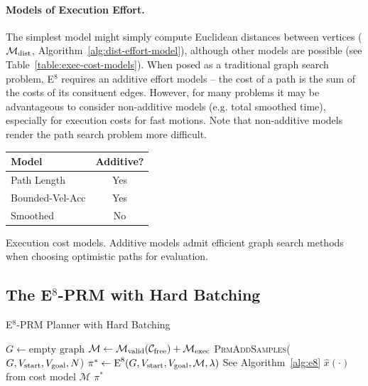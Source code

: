 \paragraph{Models of Execution Effort.}
The simplest model might simply compute Euclidean distances between
vertices
($\mathcal{M}_{\mbox{\scriptsize dist}}$,
Algorithm~\ref{alg:dist-effort-model}),
although other models are possible
(see Table~\ref{table:exec-cost-models}).
When posed as a traditional graph search problem,
E$^8$ requires an additive effort models --
the cost of a path is the sum of the costs of its consituent edges.
However,
for many problems it may be advantageous to consider
non-additive models (e.g. total smoothed time),
especially for execution costs for fast motions.
Note that non-additive models
render the path search problem more difficult.

\begin{margintable}
   \centering
   \begin{tabular}{lc}
      \toprule
      Model & Additive? \\
      \midrule
      Path Length & Yes \\
      Bounded-Vel-Acc \citep{hauser2010smoothing} & Yes \\
      Smoothed & No \\
      \bottomrule
   \end{tabular}
   \vspace{0.1in}
   \caption{Execution cost models.
      Additive models admit efficient graph search methods
      when choosing optimistic paths for evaluation.}
   \label{table:exec-cost-models}
\end{margintable}

\subsection{The E$^8$-PRM with Hard Batching}

\begin{algorithm}
\caption{E$^8$-PRM Planner with Hard Batching}
\label{alg:e8-prm-hard}
\begin{algorithmic}[1]
\State $G \leftarrow \mbox{empty graph}$
\State $\mathcal{M} \leftarrow
   \mathcal{M}_{\mbox{\scriptsize valid}}(\mathcal{C}_{\mbox{\scriptsize free}})
   + \mathcal{M}_{\mbox{\scriptsize exec}}$
\Loop
   \State \textsc{PrmAddSamples}($G,
      V_{\mbox{\scriptsize start}}, V_{\mbox{\scriptsize goal}},
      N$)
   \State $\pi^* \leftarrow \mbox{E}^8(G,
      V_{\mbox{\scriptsize start}}, V_{\mbox{\scriptsize goal}},
      \mathcal{M}, \lambda)$
      \Comment See Algorithm~\ref{alg:e8}
      \Comment $\hat{x}(\cdot)$ from cost model $\mathcal{M}$
      \State \Return $\pi^*$
   \EndIf
\EndLoop
\EndProcedure
\end{algorithmic}
\end{algorithm}

